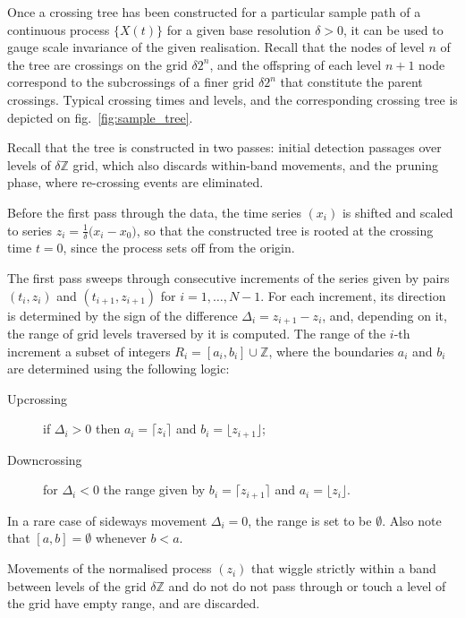 \documentclass[a4paper]{article}
\begin{document}
Once a crossing tree has been constructed for a particular sample path of a continuous
process $\{X(t)\}$ for a given base resolution $\delta>0$, it can be used to gauge
scale invariance of the given realisation. Recall that the nodes of level $n$ of
the tree are crossings on the grid $\delta 2^n$, and the offspring of each level
$n+1$ node correspond to the subcrossings of a finer grid $\delta 2^n$ that constitute
the parent crossings. Typical crossing times and levels, and the corresponding crossing
tree is depicted on fig.~\ref{fig:sample_tree}.


Recall that the tree is constructed in two passes: initial detection passages over
levels of $\delta \mathbb{Z}$ grid, which also discards within-band movements, and
the pruning phase, where re-crossing events are eliminated.

Before the first pass through the data, the time series $(x_i)$ is shifted and scaled
to series $z_i = \frac{1}{ \delta }\bigl(x_i - x_0\bigr)$, so that the constructed
tree is rooted at the crossing time $t=0$, since the process sets off from the origin.

The first pass sweeps through consecutive increments of the series given by pairs
$(t_i, z_i)$ and $(t_{i+1}, z_{i+1})$ for $i=1, \ldots, N-1$. For each increment,
its direction is determined by the sign of the difference $\Delta_i=z_{i+1}-z_i$,
and, depending on it, the range of grid levels traversed by it is computed. The
range of the $i$-th increment a subset of integers $R_i = [a_i,b_i]\cup\mathbb{Z}$,
where the boundaries $a_i$ and $b_i$ are determined using the following logic:
\begin{description}
    \item[Upcrossing] if $\Delta_i > 0$ then $a_i = \lceil z_i \rceil$
    and $b_i = \lfloor z_{i+1}\rfloor$;
    \item[Downcrossing] for $\Delta_i < 0$ the range given by $b_i = \lceil z_{i+1} \rceil$
    and $a_i = \lfloor z_i\rfloor$.
\end{description}
In a rare case of sideways movement $\Delta_i = 0$, the range is set to be $\emptyset$.
Also note that $[a,b] = \emptyset$ whenever $b<a$.

Movements of the normalised process $(z_i)$ that wiggle strictly within a band between
levels of the grid $\delta \mathbb{Z}$ and do not do not pass through or touch a level
of the grid have empty range, and are discarded.
\end{document}
